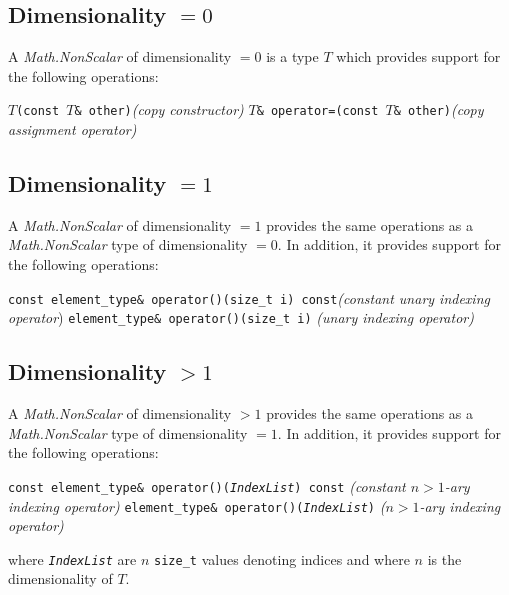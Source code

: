 \documentclass[oneside]{book}
\begin{document}
\subsection{Dimensionality $=0$}
A \textit{Math.NonScalar} of dimensionality $=0$ is a type $T$
which provides support for the following   operations:\newline

\texttt{$T$(const $T$\& other)}\textit{(copy constructor)}\newline
\texttt{$T$\& operator=(const $T$\& other)}\textit{(copy assignment operator)}\newline

\subsection{Dimensionality $=1$}
A \textit{Math.NonScalar} of dimensionality $=1$ provides the     same
operations as a \textit{Math.NonScalar} type of   dimensionality $=0$.
In addition, it provides support for the following operations:\newline

\texttt{const element\_type\& operator()(size\_t i) const}\textit{(constant unary indexing operator})\newline
\texttt{element\_type\& operator()(size\_t i)} \textit{(unary indexing operator)}\newline

\subsection{Dimensionality $>1$}
A \textit{Math.NonScalar} of dimensionality $>1$ provides the     same
operations as a \textit{Math.NonScalar} type of   dimensionality $=1$.
In addition, it provides support for the following operations:\newline

\texttt{const element\_type\& operator()(\textit{IndexList}) const} \textit{(constant $n > 1$-ary indexing operator)}\newline
\texttt{element\_type\& operator()(\textit{IndexList})} \textit{($n > 1$-ary indexing operator)}\newline

where \texttt{\textit{IndexList}} are $n$ \texttt{size\_t} values
denoting indices and where $n$ is the dimensionality of      $T$.\newline
\end{document}
